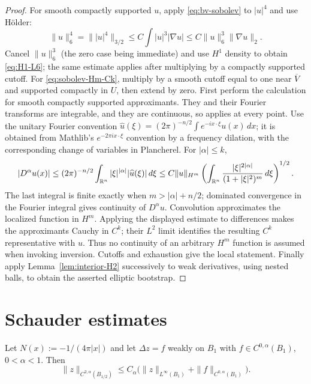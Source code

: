 \begin{proof}
For smooth compactly supported $u$, apply \eqref{eq:bv-sobolev} to $|u|^4$
and use H\"older:
\[
 \|u\|_6^4=\||u|^4\|_{3/2}
 \le C\int|u|^3|\nabla u|
 \le C\|u\|_6^3\|\nabla u\|_2.
\]
Cancel $\|u\|_6^3$ (the zero case being immediate) and use $H^1$ density to
obtain \eqref{eq:H1-L6}; the same estimate applies after multiplying by a
compactly supported cutoff.
For \eqref{eq:sobolev-Hm-Ck}, multiply by a smooth cutoff equal to one near
$\overline V$ and supported compactly in $U$, then extend by zero.  First
perform the calculation for smooth compactly supported approximants.  They
and their Fourier transforms are integrable, and they are continuous, so
 applies at every
point.  Use the unitary Fourier convention
$\widehat u(\xi)=(2\pi)^{-n/2}\int e^{-ix\cdot\xi}u(x)\,dx$; it is obtained
from Mathlib's $e^{-2\pi ix\cdot\xi}$ convention by a frequency dilation,
with the corresponding change of variables in Plancherel.  For $|\alpha|\le k$,
\[
 |D^\alpha u(x)|
 \le (2\pi)^{-n/2}\int_{\mathbb R^n}|\xi|^{|\alpha|}|\widehat u(\xi)|\,d\xi
 \le C\|u\|_{H^m}
 \left(\int_{\mathbb R^n}
   \frac{|\xi|^{2|\alpha|}}{(1+|\xi|^2)^m}\,d\xi\right)^{1/2}.
\]
The last integral is finite exactly when $m>|\alpha|+n/2$; dominated
convergence in the Fourier integral gives continuity of $D^\alpha u$.
Convolution approximates the localized function in $H^m$.  Applying the
displayed estimate to differences makes the approximants Cauchy in $C^k$;
their $L^2$ limit identifies the resulting $C^k$ representative with $u$.
Thus no continuity of an arbitrary $H^m$ function is assumed when invoking
inversion.  Cutoffs and exhaustion give the local statement.  Finally apply
Lemma~\ref{lem:interior-H2} successively to weak derivatives, using nested
balls, to obtain the asserted elliptic bootstrap.
\end{proof}

\section{Schauder estimates}\label{sec:schauder}

\begin{theorem}\label{thm:newtonian-schauder}
Let $N(x):=-1/(4\pi|x|)$ and let $\Delta z=f$ weakly on $B_1$ with
$f\in C^{0,\alpha}(B_1)$, $0<\alpha<1$.  Then
\begin{equation}\label{eq:newtonian-schauder}
  \|z\|_{C^{2,\alpha}(B_{1/2})}
  \le C_\alpha\bigl(\|z\|_{L^\infty(B_1)}+\|f\|_{C^{0,\alpha}(B_1)}\bigr).
\end{equation}
\end{theorem}

